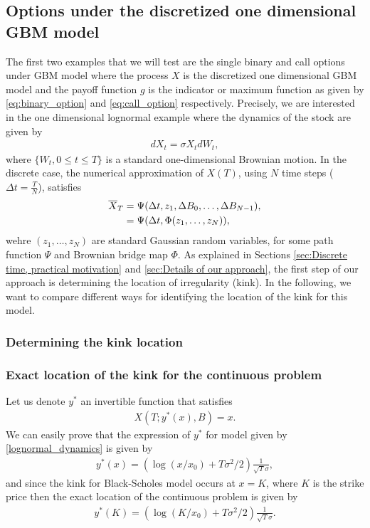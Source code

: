 \subsection{Options under the discretized one dimensional GBM model}\label{sec:The discretized 1D Black-Scholes}
The first two  examples that we will  test are  the single binary and  call options under GBM model where the process $X$ is the discretized one dimensional GBM model and the payoff function $g$ is the indicator or maximum function as given by \eqref{eq:binary_option} and \eqref{eq:call_option} respectively. Precisely, we are interested in the  one dimensional lognormal example where the dynamics of the stock are given by
\begin{align}\label{lognormal_dynamics}
	dX_t=\sigma X_t dW_t,
\end{align}
where $\{W_t, 0 \leq t \leq T\} $ is a standard one-dimensional Brownian motion. In the discrete case, the numerical approximation of $X(T)$, using $N$ time steps ($\Delta t=\frac{T}{N}$), satisfies
\begin{align}
	\overline{X}_T&=\Psi(\Delta t, z_1, \Delta B_0,\dots,\Delta B_{N-1}), \\ \nonumber
	&=\Psi(\Delta t, \Phi(z_1,\dots,z_N)),
\end{align}
wehre $(z_1,\dots,z_N)$ are standard Gaussian random variables, for some path function $\Psi$ and Brownian bridge map $\Phi$. As explained in Sections \ref{sec:Discrete time, practical motivation} and \ref{sec:Details of our approach}, the first step of our approach is determining the location of irregularity (kink). In the following, we want to compare different ways for identifying the location of the kink for this model.
\subsubsection{Determining the kink location}\label{sec:Determining the kink location}
\subsubsection*{Exact location of the kink for the continuous problem}
Let us denote $y^{\ast}$ an invertible function that satisfies 
\begin{align}\label{eq: kink_point_problem}
	X(T;y^{\ast}(x),B)=x.
\end{align}
We can easily prove that the expression of $y^{\ast}$ for model given by \eqref{lognormal_dynamics} is given by
\begin{align}
	y^{\ast}(x)=\left(\operatorname{log}(x/x_0)+T \sigma^2/2\right) \frac{1}{\sqrt{T} \sigma}, 
\end{align}
and since the kink for Black-Scholes model occurs at $x=K$, where $K
$ is the strike price then  the exact location of the continuous problem is given by 
\begin{align}\label{xact_location_continuous_problem}
	y^{\ast}(K)=\left(\operatorname{log}(K/x_0)+T \sigma^2/2\right) \frac{1}{\sqrt{T} \sigma}.
\end{align}
